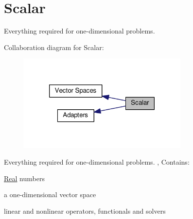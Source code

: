 \hypertarget{group__ScalarGroup}{\section{Scalar}
\label{group__ScalarGroup}
}


Everything required for one-\/dimensional problems.  


Collaboration diagram for Scalar\-:
\nopagebreak
\begin{figure}[H]
\begin{center}
\leavevmode
\includegraphics[width=242pt]{group__ScalarGroup}
\end{center}
\end{figure}
Everything required for one-\/dimensional problems. , Contains\-:
\begin{DoxyItemize}
\item \hyperlink{classSpacy_1_1Real}{Real} numbers
\item a one-\/dimensional vector space
\item linear and nonlinear operators, functionals and solvers 
\end{DoxyItemize}